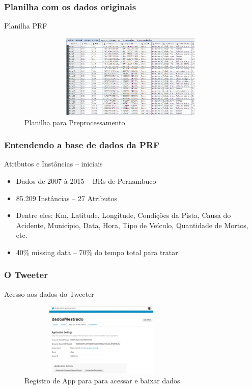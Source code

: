 \documentclass[11pt]{beamer}
\begin{document}

\begin{frame}\frametitle{ Planilha com os dados originais}
	\transboxin[duration=1, direction=25]	
	\begin{block}{ Planilha PRF}
		\begin{figure}[!ht]
			\centering %
			\caption{Planilha para Preprocessamento}
			\includegraphics[width=110mm, height=40mm]{Figuras/BigData/PlanilhaPRF.png}
		\end{figure}
	\end{block}
\end{frame}


\begin{frame}
	\frametitle{ Entendendo a base de dados da PRF}
	\begin{exampleblock}{ Atributos e Instâncias -- iniciais}
		\begin{itemize}
			\item Dados de 2007 à 2015 -- BRs de Pernambuco
			\pause
			\item 85.209 Instâncias -- 27 Atributos
			\pause
			\item Dentre eles: Km, Latitude, Longitude, Condições da Pista, Causa do Acidente, Município, Data, Hora, Tipo de Veículo, Quantidade de Mortos, etc.
			\pause
			\item 40\% missing data -- 70\% do tempo total para tratar
		\end{itemize}
	\end{exampleblock}
\end{frame}

\begin{frame}\frametitle{ O Tweeter}
	\begin{block}{ Acesso aos dados do Tweeter}
		\begin{figure}[!ht]
			\centering %
			\caption{Registro de App para para acessar e baixar dados}
			\includegraphics[width=80mm, height=35mm]{Figuras/BigData/appTweeter.png}
		\end{figure}
	\end{block}
\end{frame}
\end{document}

